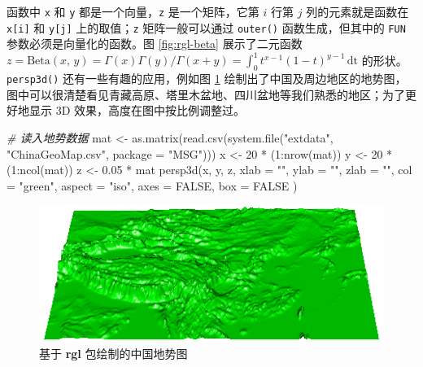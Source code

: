 \documentclass[
  b5paper,
  UTF8,twoside]{book}
\newenvironment{Shaded}{\begin{snugshade}}{\end{snugshade}}
\newcommand{\AttributeTok}[1]{\textcolor[rgb]{0.77,0.63,0.00}{#1}}
\newcommand{\CommentTok}[1]{\textcolor[rgb]{0.56,0.35,0.01}{\textit{#1}}}
\newcommand{\ConstantTok}[1]{\textcolor[rgb]{0.00,0.00,0.00}{#1}}
\newcommand{\DecValTok}[1]{\textcolor[rgb]{0.00,0.00,0.81}{#1}}
\newcommand{\FloatTok}[1]{\textcolor[rgb]{0.00,0.00,0.81}{#1}}
\newcommand{\FunctionTok}[1]{\textcolor[rgb]{0.00,0.00,0.00}{#1}}
\newcommand{\NormalTok}[1]{#1}
\newcommand{\OtherTok}[1]{\textcolor[rgb]{0.56,0.35,0.01}{#1}}
\newcommand{\SpecialCharTok}[1]{\textcolor[rgb]{0.00,0.00,0.00}{#1}}
\newcommand{\StringTok}[1]{\textcolor[rgb]{0.31,0.60,0.02}{#1}}
\begin{document}
函数中 \texttt{x} 和 \texttt{y} 都是一个向量，\texttt{z} 是一个矩阵，它第 \(i\) 行第 \(j\) 列的元素就是函数在 \texttt{x{[}i{]}} 和 \texttt{y{[}j{]}} 上的取值；\texttt{z} 矩阵一般可以通过 \texttt{outer()} 函数生成，但其中的 \texttt{FUN} 参数必须是向量化的函数。图 \ref{fig:rgl-beta} 展示了二元函数 \(z = \mathrm{Beta}(x,\,y) = \Gamma(x)\Gamma(y)/\Gamma(x+y) = \int_{0}^{1}t^{x-1}(1-t)^{y-1}\,\mathrm{dt}\) 的形状。\texttt{persp3d()} 还有一些有趣的应用，例如图 \ref{fig:rgl-china-map} 绘制出了中国及周边地区的地势图，图中可以很清楚看见青藏高原、塔里木盆地、四川盆地等我们熟悉的地区；为了更好地显示 3D 效果，高度在图中按比例调整过。

\begin{Shaded}
\begin{Highlighting}[]
\CommentTok{\# 读入地势数据}
\NormalTok{mat }\OtherTok{\textless{}{-}} \FunctionTok{as.matrix}\NormalTok{(}\FunctionTok{read.csv}\NormalTok{(}\FunctionTok{system.file}\NormalTok{(}\StringTok{"extdata"}\NormalTok{, }\StringTok{"ChinaGeoMap.csv"}\NormalTok{, }\AttributeTok{package =} \StringTok{"MSG"}\NormalTok{)))}
\NormalTok{x }\OtherTok{\textless{}{-}} \DecValTok{20} \SpecialCharTok{*}\NormalTok{ (}\DecValTok{1}\SpecialCharTok{:}\FunctionTok{nrow}\NormalTok{(mat))}
\NormalTok{y }\OtherTok{\textless{}{-}} \DecValTok{20} \SpecialCharTok{*}\NormalTok{ (}\DecValTok{1}\SpecialCharTok{:}\FunctionTok{ncol}\NormalTok{(mat))}
\NormalTok{z }\OtherTok{\textless{}{-}} \FloatTok{0.05} \SpecialCharTok{*}\NormalTok{ mat}
\FunctionTok{persp3d}\NormalTok{(x, y, z,}
  \AttributeTok{xlab =} \StringTok{""}\NormalTok{, }\AttributeTok{ylab =} \StringTok{""}\NormalTok{, }\AttributeTok{zlab =} \StringTok{""}\NormalTok{,}
  \AttributeTok{col =} \StringTok{"green"}\NormalTok{, }\AttributeTok{aspect =} \StringTok{"iso"}\NormalTok{, }\AttributeTok{axes =} \ConstantTok{FALSE}\NormalTok{, }\AttributeTok{box =} \ConstantTok{FALSE}
\NormalTok{)}
\end{Highlighting}
\end{Shaded}

\begin{figure}

{\centering \includegraphics{images/rgl-china-map} 

}

\caption[基于 \textbf{rgl} 包绘制的中国地势图]{基于 \textbf{rgl} 包绘制的中国地势图}\label{fig:rgl-china-map}
\end{figure}
\end{document}
